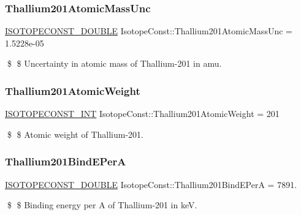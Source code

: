 \subsubsection{\texorpdfstring{Thallium201\+Atomic\+Mass\+Unc}{Thallium201AtomicMassUnc}}
{\footnotesize\ttfamily \mbox{\hyperlink{group___isotope_const-_macros_ga8f45a7272ce02c0b4c65c44636ed719a}{I\+S\+O\+T\+O\+P\+E\+C\+O\+N\+S\+T\+\_\+\+D\+O\+U\+B\+LE}} Isotope\+Const\+::\+Thallium201\+Atomic\+Mass\+Unc = 1.\+5228e-\/05}

\$ \$ Uncertainty in atomic mass of Thallium-\/201 in amu. \mbox{\label{group___isotope_const-_thallium-_tl201_gacde9abfd8f728161b8b7d65aaffca0e2}} 
\subsubsection{\texorpdfstring{Thallium201\+Atomic\+Weight}{Thallium201AtomicWeight}}
{\footnotesize\ttfamily \mbox{\hyperlink{group___isotope_const-_macros_ga5f18360b3e99483a35c32d789e62621c}{I\+S\+O\+T\+O\+P\+E\+C\+O\+N\+S\+T\+\_\+\+I\+NT}} Isotope\+Const\+::\+Thallium201\+Atomic\+Weight = 201}

\$ \$ Atomic weight of Thallium-\/201. \mbox{\label{group___isotope_const-_thallium-_tl201_ga01980d4f44974a02da824cf78e881705}} 
\subsubsection{\texorpdfstring{Thallium201\+Bind\+E\+PerA}{Thallium201BindEPerA}}
{\footnotesize\ttfamily \mbox{\hyperlink{group___isotope_const-_macros_ga8f45a7272ce02c0b4c65c44636ed719a}{I\+S\+O\+T\+O\+P\+E\+C\+O\+N\+S\+T\+\_\+\+D\+O\+U\+B\+LE}} Isotope\+Const\+::\+Thallium201\+Bind\+E\+PerA = 7891.}

\$ \$ Binding energy per A of Thallium-\/201 in keV. \mbox{\label{group___isotope_const-_thallium-_tl201_gab3ad0250ce87561ba0cf3d6d45d1b7f0}} 
